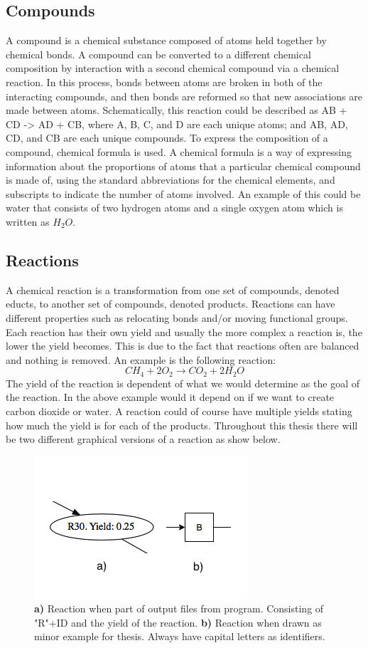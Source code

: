 \documentclass[a4paper,10pt,titlepage]{paper}
\begin{document}
\subsection{Compounds}
A compound is a chemical substance composed of atoms held together by chemical bonds.
A compound can be converted to a different chemical composition by interaction with a second chemical compound via a chemical reaction. In this process, bonds between atoms are broken in both of the interacting compounds, and then bonds are reformed so that new associations are made between atoms. Schematically, this reaction could be described as AB + CD -> AD + CB, where A, B, C, and D are each unique atoms; and AB, AD, CD, and CB are each unique compounds.
To express the composition of a compound, chemical formula is used. A chemical formula is a way of expressing information about the proportions of atoms that a particular chemical compound is made of, using the standard abbreviations for the chemical elements, and subscripts to indicate the number of atoms involved. An example of this could be water that consists of two hydrogen atoms and a single oxygen atom which is written as $H_2O$.


\subsection{Reactions}
A chemical reaction is a transformation from one set of compounds, denoted educts, to another set of compounds, denoted products. Reactions can have different properties such as relocating bonds and/or moving functional groups. Each reaction has their own yield and usually the more complex a reaction is, the lower the yield becomes. This is due to the fact that reactions often are balanced and nothing is removed. An example is the following reaction:
\begin{equation}
CH_4 + 2O_2 \rightarrow CO_2 + 2H_2O
\end{equation}
The yield of the reaction is dependent of what we would determine as the goal of the reaction. In the above example would it depend on if we want to create carbon dioxide or water. A reaction could of course have multiple yields stating how much the yield is for each of the products. Throughout this thesis there will be two different graphical versions of a reaction as show below.
\begin{figure}[H]
\centering
\includegraphics[scale=0.5]{Billeder/Reactions.png}
\caption{\textbf{a)} Reaction when part of output files from program. Consisting of "R"+ID and the yield of the reaction. \textbf{b)} Reaction when drawn as minor example for thesis. Always have capital letters as identifiers.}
\end{figure}
\end{document}
